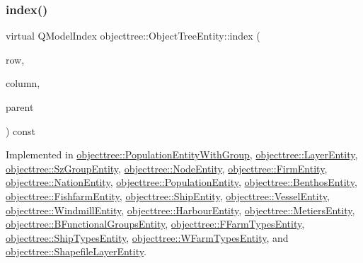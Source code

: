 \subsubsection{\texorpdfstring{index()}{index()}}
{\footnotesize\ttfamily virtual Q\+Model\+Index objecttree\+::\+Object\+Tree\+Entity\+::index (\begin{DoxyParamCaption}\item[{int}]{row,  }\item[{int}]{column,  }\item[{const Q\+Model\+Index \&}]{parent }\end{DoxyParamCaption}) const\hspace{0.3cm}{\ttfamily [pure virtual]}}



Implemented in \mbox{\hyperlink{classobjecttree_1_1_population_entity_with_group_a244b149daf0735eca66a33b6f68773ed}{objecttree\+::\+Population\+Entity\+With\+Group}}, \mbox{\hyperlink{classobjecttree_1_1_layer_entity_a168d47ed5cdde5455a5b0f124cbee0a9}{objecttree\+::\+Layer\+Entity}}, \mbox{\hyperlink{classobjecttree_1_1_sz_group_entity_ac467abe2de104e9f99c0e1520d4a2053}{objecttree\+::\+Sz\+Group\+Entity}}, \mbox{\hyperlink{classobjecttree_1_1_node_entity_a2ad069b13c5ce29c4239acd2c4eeda24}{objecttree\+::\+Node\+Entity}}, \mbox{\hyperlink{classobjecttree_1_1_firm_entity_a8df24819f408a5e5935e62123b4c91f0}{objecttree\+::\+Firm\+Entity}}, \mbox{\hyperlink{classobjecttree_1_1_nation_entity_a29d4f8e8200a1573413da0695313bdc2}{objecttree\+::\+Nation\+Entity}}, \mbox{\hyperlink{classobjecttree_1_1_population_entity_a66228e77f0aff3907f18a3a629e37136}{objecttree\+::\+Population\+Entity}}, \mbox{\hyperlink{classobjecttree_1_1_benthos_entity_aa6fee60ab1e162af5925f7662a5e51fd}{objecttree\+::\+Benthos\+Entity}}, \mbox{\hyperlink{classobjecttree_1_1_fishfarm_entity_a798031bca853586ff538fa667609fb83}{objecttree\+::\+Fishfarm\+Entity}}, \mbox{\hyperlink{classobjecttree_1_1_ship_entity_ad72753eef565dec48ce6a4b8fcd07c4e}{objecttree\+::\+Ship\+Entity}}, \mbox{\hyperlink{classobjecttree_1_1_vessel_entity_a20c7a77debdacf5dfe526c8b74557029}{objecttree\+::\+Vessel\+Entity}}, \mbox{\hyperlink{classobjecttree_1_1_windmill_entity_a319b7b2133002caa1c2be248e6711263}{objecttree\+::\+Windmill\+Entity}}, \mbox{\hyperlink{classobjecttree_1_1_harbour_entity_a70b27c05c76b447a183c05a1318e96ee}{objecttree\+::\+Harbour\+Entity}}, \mbox{\hyperlink{classobjecttree_1_1_metiers_entity_af72f3b12bc78b56985b6818dab24626b}{objecttree\+::\+Metiers\+Entity}}, \mbox{\hyperlink{classobjecttree_1_1_b_functional_groups_entity_a52beb91ea69c7ee35ea1da3facc97196}{objecttree\+::\+B\+Functional\+Groups\+Entity}}, \mbox{\hyperlink{classobjecttree_1_1_f_farm_types_entity_af2a94ebd0631e46e494a87e60153bde9}{objecttree\+::\+F\+Farm\+Types\+Entity}}, \mbox{\hyperlink{classobjecttree_1_1_ship_types_entity_a0ce8b95e0324fe6d91de55e71b4de5fa}{objecttree\+::\+Ship\+Types\+Entity}}, \mbox{\hyperlink{classobjecttree_1_1_w_farm_types_entity_ae756759d943f0de894f9013a89019518}{objecttree\+::\+W\+Farm\+Types\+Entity}}, and \mbox{\hyperlink{classobjecttree_1_1_shapefile_layer_entity_a05d31fc56c4c57c919bd1bab7fd31ca9}{objecttree\+::\+Shapefile\+Layer\+Entity}}.

